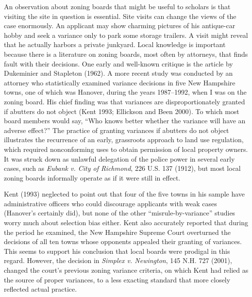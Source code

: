 

An observation about zoning boards that might be useful to scholars is that
visiting the site in question is essential. Site visits can change the views of
the case enormously. An applicant may show charming pictures of his antique-car
hobby and seek a variance only to park some storage trailers. A visit might
reveal that he actually harbors a private junkyard. Local knowledge is important
because there is a literature on zoning boards, most often by attorneys, that
finds fault with their decisions. One early and well-known critique is the
article by Dukeminier and Stapleton (1962). A more recent study was conducted by
an attorney who statistically examined variance decisions in five New Hampshire
towns, one of which was Hanover, during the years 1987--1992, when I was on the
zoning board. His chief finding was that variances are disproportionately
granted if abutters do not object (Kent 1993; Ellickson and Been 2000). To which
most board members would say, ``Who knows better whether the variance will have
an adverse effect?'' The practice of granting variances if abutters do not
object illustrates the recurrence of an early, grassroots approach to land use
regulation, which required nonconforming uses to obtain permission of local
property owners. It was struck down as unlawful delegation of the police power
in several early cases, such as \emph{Eubank v. City of Richmond}, 226 U.S. 137
(1912), but most local zoning boards informally operate as if it were still in
effect.

Kent (1993) neglected to point out that four of the five towns in his sample
have administrative officers who could discourage applicants with weak cases
(Hanover's certainly did), but none of the other ``misrule-by-variance'' studies
worry much about selection bias either. Kent also accurately reported that
during the period he examined, the New Hampshire Supreme Court overturned the
decisions of all ten towns whose opponents appealed their granting of variances.
This seems to support his conclusion that local boards were prodigal in this
regard. However, the decision in \emph{Simplex v. Newington}, 145 N.H. 727
(2001), changed the court's previous zoning variance criteria, on which Kent had
relied as the source of proper variances, to a less exacting standard that more
closely reflected actual practice.

